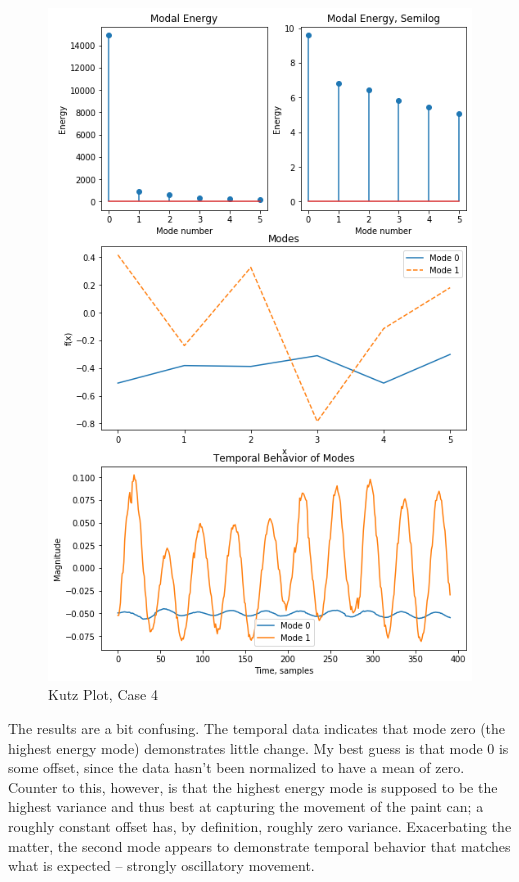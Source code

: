 \documentclass[journal]{IEEEtran}
\begin{document}
\begin{figure}
	\centerline{\includegraphics[width=\columnwidth]{kutz4.png}}
	\caption{Kutz Plot, Case 4}
	\label{kutz4}
\end{figure}

The results are a bit confusing. The temporal data indicates that mode zero (the highest energy mode)
demonstrates little change. My best guess is that mode 0 is some offset, since the data hasn't been
normalized to have a mean of zero. Counter to this, however, is that the highest energy mode is
supposed to be the highest variance and thus best at capturing the movement of the paint can; a
roughly constant offset has, by definition, roughly zero variance. Exacerbating the matter, the
second mode appears to demonstrate temporal behavior that matches what is expected -- strongly
oscillatory movement.
\end{document}
